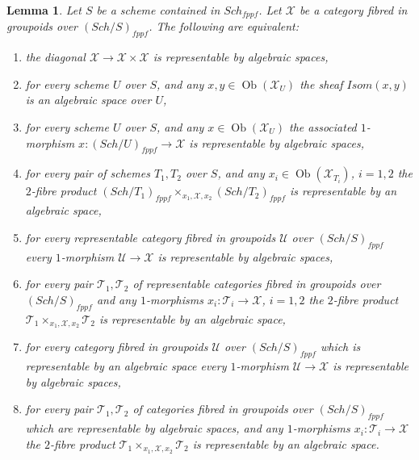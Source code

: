 \documentclass{stacks-project}
\theoremstyle{plain}
\newtheorem{lemma}[subsection]{Lemma}
\theoremstyle{definition}
\theoremstyle{remark}
\numberwithin{equation}{subsection}
\def\Sch{\mathit{Sch}}
\def\Ob{\mathop{\mathrm{Ob}}\nolimits}
\begin{document}
\begin{lemma}
\label{lemma-representable-diagonal}
Let $S$ be a scheme contained in $\Sch_{fppf}$.
Let $\mathcal{X}$ be a category fibred in groupoids over
$(\Sch/S)_{fppf}$. The following are equivalent:
\begin{enumerate}
\item the diagonal $\mathcal{X} \to \mathcal{X} \times \mathcal{X}$
is representable by algebraic spaces,
\item for every scheme $U$ over $S$, and any
$x, y \in \Ob(\mathcal{X}_U)$ the sheaf
$\mathit{Isom}(x, y)$ is an algebraic space over $U$,
\item for every scheme $U$ over $S$, and any $x \in \Ob(\mathcal{X}_U)$
the associated $1$-morphism $x : (\Sch/U)_{fppf} \to \mathcal{X}$
is representable by algebraic spaces,
\item for every pair of schemes $T_1, T_2$ over $S$, and any
$x_i \in \Ob(\mathcal{X}_{T_i})$, $i = 1, 2$ the $2$-fibre product
$(\Sch/T_1)_{fppf} \times_{x_1, \mathcal{X}, x_2}
(\Sch/T_2)_{fppf}$
is representable by an algebraic space,
\item for every representable category fibred in groupoids $\mathcal{U}$
over $(\Sch/S)_{fppf}$ every $1$-morphism
$\mathcal{U} \to \mathcal{X}$ is representable by algebraic spaces,
\item for every pair $\mathcal{T}_1, \mathcal{T}_2$ of representable
categories fibred in groupoids over $(\Sch/S)_{fppf}$ and any
$1$-morphisms $x_i : \mathcal{T}_i \to \mathcal{X}$, $i = 1, 2$ the
$2$-fibre product $\mathcal{T}_1 \times_{x_1, \mathcal{X}, x_2} \mathcal{T}_2$
is representable by an algebraic space,
\item for every category fibred in groupoids $\mathcal{U}$
over $(\Sch/S)_{fppf}$ which is
representable by an algebraic space every $1$-morphism
$\mathcal{U} \to \mathcal{X}$ is representable by algebraic spaces,
\item for every pair $\mathcal{T}_1, \mathcal{T}_2$ of categories fibred
in groupoids over $(\Sch/S)_{fppf}$ which are representable
by algebraic spaces, and any $1$-morphisms
$x_i : \mathcal{T}_i \to \mathcal{X}$ the
$2$-fibre product $\mathcal{T}_1 \times_{x_1, \mathcal{X}, x_2} \mathcal{T}_2$
is representable by an algebraic space.
\end{enumerate}
\end{lemma}
\end{document}
